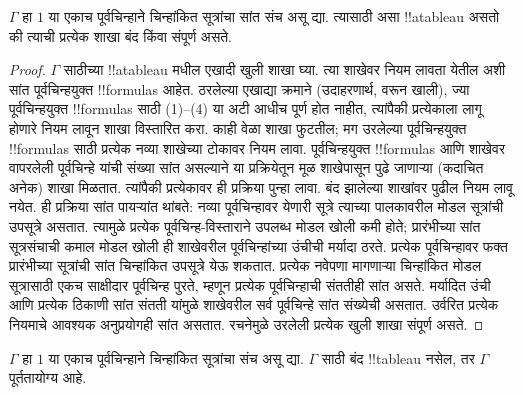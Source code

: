 \documentclass[../../../include/open-logic-section]{subfiles}
\begin{document}
\begin{prop}
  $\Gamma$ हा $1$ या एकाच पूर्वचिन्हाने चिन्हांकित सूत्रांचा
  सांत संच असू द्या. त्यासाठी असा !!a{tableau} असतो की
  त्याची प्रत्येक शाखा बंद किंवा संपूर्ण असते.
\end{prop}

\begin{proof}
  $\Gamma$ साठीच्या !!a{tableau} मधील
  एखादी खुली शाखा घ्या. त्या शाखेवर नियम
  लावता येतील अशी सांत पूर्वचिन्हयुक्त
  !!{formula}s आहेत. ठरलेल्या एखाद्या क्रमाने
  (उदाहरणार्थ, वरून खाली), ज्या
  पूर्वचिन्हयुक्त !!{formula}s साठी
  (1)--(4) या अटी आधीच पूर्ण होत नाहीत,
  त्यांपैकी प्रत्येकाला लागू होणारे नियम
  लावून शाखा विस्तारित करा. काही वेळा शाखा
  फुटतील; मग उरलेल्या पूर्वचिन्हयुक्त
  !!{formula}s साठी प्रत्येक नव्या शाखेच्या
  टोकावर नियम लावा. पूर्वचिन्हयुक्त
  !!{formula}s आणि शाखेवर वापरलेली
  पूर्वचिन्हे यांची संख्या सांत असल्याने
  या प्रक्रियेतून मूळ शाखेपासून पुढे जाणाऱ्या
  (कदाचित अनेक) शाखा मिळतात. त्यांपैकी
  प्रत्येकावर ही प्रक्रिया पुन्हा लावा.
  बंद झालेल्या शाखांवर पुढील नियम लावू नयेत.
  ही प्रक्रिया सांत पायऱ्यांत थांबते: नव्या पूर्वचिन्हावर येणारी
  सूत्रे त्याच्या पालकावरील मोडल सूत्रांची उपसूत्रे असतात.
  त्यामुळे प्रत्येक पूर्वचिन्ह-विस्ताराने उपलब्ध मोडल खोली कमी
  होते; प्रारंभीच्या सांत सूत्रसंचाची कमाल मोडल खोली ही शाखेवरील
  पूर्वचिन्हांच्या उंचीची मर्यादा ठरते. प्रत्येक पूर्वचिन्हावर फक्त
  प्रारंभीच्या सूत्रांची सांत चिन्हांकित उपसूत्रे येऊ शकतात.
  प्रत्येक नवेपणा मागणाऱ्या चिन्हांकित मोडल सूत्रासाठी एकच
  साक्षीदार पूर्वचिन्ह पुरते, म्हणून प्रत्येक पूर्वचिन्हाची संततीही
  सांत असते. मर्यादित उंची आणि प्रत्येक ठिकाणी सांत संतती
  यांमुळे शाखेवरील सर्व पूर्वचिन्हे सांत संख्येची असतात.
  उर्वरित प्रत्येक नियमाचे आवश्यक अनुप्रयोगही सांत असतात.
  रचनेमुळे उरलेली प्रत्येक खुली शाखा संपूर्ण असते.
\end{proof}

\begin{thm}[संपूर्णता]
  $\Gamma$ हा $1$ या एकाच पूर्वचिन्हाने चिन्हांकित सूत्रांचा संच असू द्या.
  $\Gamma$ साठी बंद !!{tableau} नसेल,
  तर $\Gamma$ पूर्ततायोग्य आहे.
\end{thm}
\end{document}
